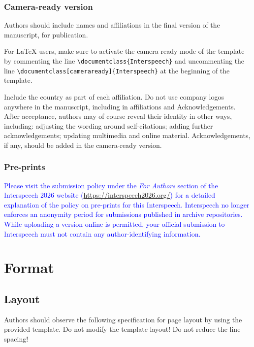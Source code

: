 \documentclass[cameraready]{Interspeech}
\newcommand{\blue}[1]{\textcolor{blue}{#1}}
\begin{document}
\subsubsection{Camera-ready version}

Authors should include names and affiliations in the final version of the manuscript, for publication.

{\color{blue}
For \LaTeX{} users, make sure to activate the camera-ready mode of the template by commenting the line \verb|\documentclass{Interspeech}| and uncommenting the line \verb|\documentclass[cameraready]{Interspeech}| at the beginning of the template.
}

Include the country as part of each affiliation. Do not use company logos anywhere in the manuscript, including in affiliations and Acknowledgements. After acceptance, authors may of course reveal their identity in other ways, including: adjusting the wording around self-citations; adding further acknowledgements; updating multimedia and online material. Acknowledgements, if any, should be added in the camera-ready version.

\subsubsection{Pre-prints}
\label{section:preprints}

\blue{Please visit the submission policy under the \textit{For Authors} section of the Interspeech 2026 website (\url{https://interspeech2026.org/}) for a detailed explanation of the policy on pre-prints for this Interspeech. Interspeech no longer enforces an anonymity period for submissions published in archive repositories.  While uploading a version online is permitted, your official submission to Interspeech must not contain any author-identifying information.}



\section{Format}

\subsection{Layout}

Authors should observe the following specification for page layout by using the provided template. Do not modify the template layout! Do not reduce the line spacing!
\end{document}
